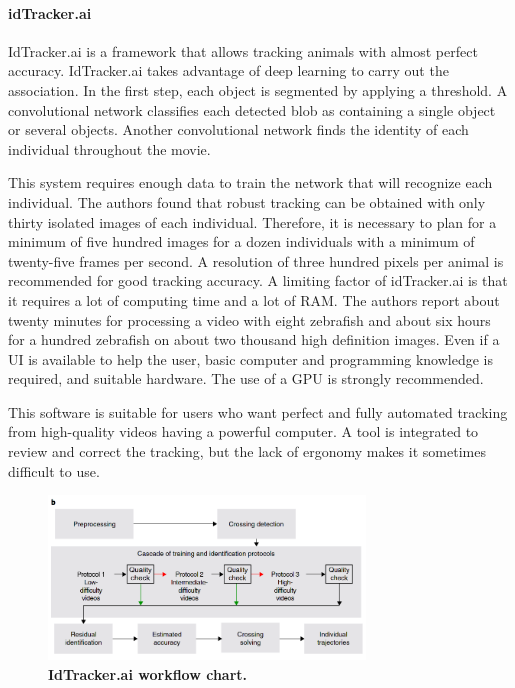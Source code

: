     \paragraph{idTracker.ai}
    IdTracker.ai \cite{romero2019idtracker} is a framework that allows tracking animals with almost perfect accuracy. IdTracker.ai takes advantage of deep learning to carry out the association. In the first step, each object is segmented by applying a threshold. A convolutional network classifies each detected blob as containing a single object or several objects. Another convolutional network finds the identity of each individual throughout the movie.

    This system requires enough data to train the network that will recognize each individual. The authors found that robust tracking can be obtained with only thirty isolated images of each individual. Therefore, it is necessary to plan for a minimum of five hundred images for a dozen individuals with a minimum of twenty-five frames per second. A resolution of three hundred pixels per animal is recommended for good tracking accuracy. A limiting factor of idTracker.ai is that it requires a lot of computing time and a lot of RAM. The authors report about twenty minutes for processing a video with eight zebrafish and about six hours for a hundred zebrafish on about two thousand high definition images. Even if a UI is available to help the user, basic computer and programming knowledge is required, and suitable hardware. The use of a GPU is strongly recommended.

    This software is suitable for users who want perfect and fully automated tracking from high-quality videos having a powerful computer. A tool is integrated to review and correct the tracking, but the lack of ergonomy makes it sometimes difficult to use.

    \begin{figure}[h]
    \centering
    \includegraphics[width=0.75\textwidth]{part_1/assets/idtrackerai.png}
    \caption{{\bf IdTracker.ai workflow chart.}}
    \label{part_1:idtrackerai}
    \end{figure}

